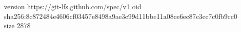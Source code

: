 version https://git-lfs.github.com/spec/v1
oid sha256:8c872484e4606cf03457e8498a9ae3c99d11bbe11a08ce6ec87c3cc7c0fb9cc0
size 2878
